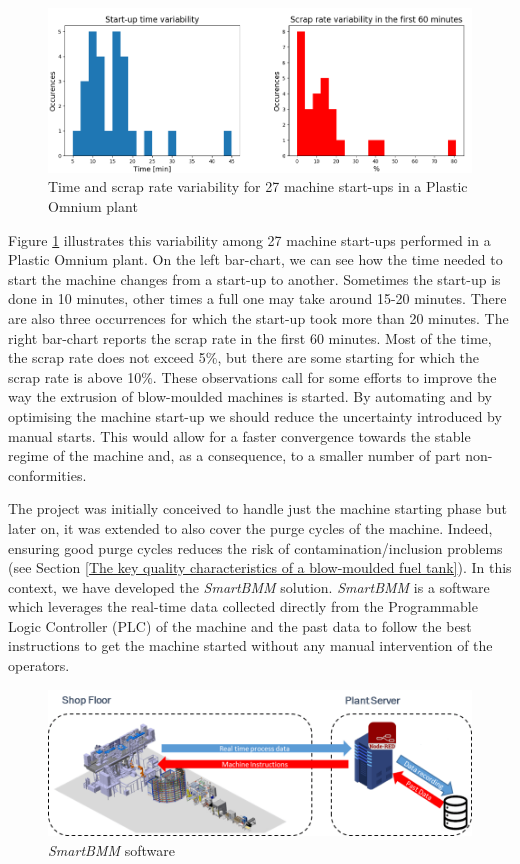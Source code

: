 \begin{figure}
\centerline{\includegraphics[scale=0.7]{images/chapter_3/smartbmm_barchart.png}}
\caption{Time and scrap rate variability for 27 machine start-ups in a Plastic Omnium plant}
\label{fig:smartbmm_barchart}
\end{figure}
%
Figure \ref{fig:smartbmm_barchart} illustrates this variability among 27 machine start-ups performed in a Plastic Omnium plant. On the left bar-chart, we can see how the time needed to start the machine changes from a start-up to another. Sometimes the start-up is done in 10 minutes, other times a full one may take around 15-20 minutes. There are also three occurrences for which the start-up took more than 20 minutes. The right bar-chart reports the scrap rate in the first 60 minutes. Most of the time, the scrap rate does not exceed 5\%, but there are some starting for which the scrap rate is above 10\%. These observations call for some efforts to improve the way the extrusion of blow-moulded machines is started. By automating and by optimising the machine start-up we should reduce the uncertainty introduced by manual starts. This would allow for a faster convergence towards the stable regime of the machine and, as a consequence, to a smaller number of part non-conformities.   

The project was initially conceived to handle just the machine starting phase but later on, it was extended to also cover the purge cycles of the machine. Indeed, ensuring good purge cycles reduces the risk of contamination/inclusion problems (see Section \ref{The key quality characteristics of a blow-moulded fuel tank}). In this context, we have developed the \textit{SmartBMM} solution. \textit{SmartBMM} is a software which leverages the real-time data collected directly from the  Programmable Logic Controller (PLC) of the machine and the past data to follow the best instructions to get the machine started without any manual intervention of the operators.

\begin{figure}
\centerline{\includegraphics[scale=0.55]{images/chapter_3/SmartBMM.png}}
\caption{\textit{SmartBMM} software}
\label{fig:SmartBMM}
\end{figure}


